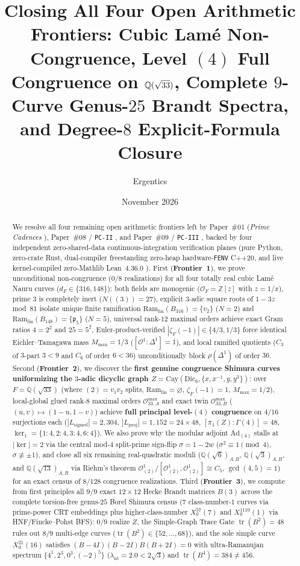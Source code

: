 \documentclass[11pt]{amsart}
\title[Closing All Four Open Arithmetic Frontiers]{Closing All Four Open Arithmetic Frontiers: Cubic Lam\'e Non-Congruence, Level \texorpdfstring{$(4)$}{(4)} Full Congruence on \texorpdfstring{$\Q(\sqrt{33})$}{Q(sqrt(33))}, Complete $9$-Curve Genus-$25$ Brandt Spectra, and Degree-$8$ Explicit-Formula Closure}
\author{Ergentics}
\date{November 2026}
\numberwithin{equation}{section}
\theoremstyle{plain}
\theoremstyle{definition}\newtheorem{definition}[theorem]{Definition}
\theoremstyle{remark}\newtheorem{remark}[theorem]{Remark}
\newcommand{\Q}{\mathbb{Q}}
\newcommand{\Z}{\mathbb{Z}}
\newcommand{\calO}{\mathcal{O}}
\newcommand{\frp}{\mathfrak{p}}
\newcommand{\Cay}{\mathrm{Cay}}
\newcommand{\Dic}{\mathrm{Dic}}
\newcommand{\Ad}{\mathrm{Ad}}
\newcommand{\Ram}{\mathrm{Ram}}
\begin{document}
\begin{abstract}
We resolve all four remaining open arithmetic frontiers left by Paper~\#01 (\emph{Prime Cadences} \cite{ergentics2026pc}), Paper~\#08 / \texttt{PC-II} \cite{ergentics2026pc2}, and Paper~\#09 / \texttt{PC-III} \cite{ergentics2026pc3}, backed by four independent zero-shared-data continuous-integration verification planes (pure Python, zero-crate Rust, dual-compiler freestanding zero-heap hardware-\texttt{FENV} C++20, and live kernel-compiled zero-Mathlib Lean~4.36.0 \cite{mouraullrich2021}).
First (\textbf{Frontier~1}), we prove unconditional non-congruence ($0/8$ realizations) for all four totally real cubic Lam\'e Nauru curves ($d_F \in \{316, 148\}$): both fields are monogenic ($\calO_F = \Z[z]$ with $z=1/x$), prime $3$ is completely inert ($N((3))=27$), explicit $3$-adic square roots of $1-3z$ mod~$81$ isolate unique finite ramification $\Ram_{\mathrm{fin}}(B_{316})=\{v_2\}$ ($N=2$) and $\Ram_{\mathrm{fin}}(B_{148})=\{\frp_5\}$ ($N=5$), universal rank-$12$ maximal orders achieve exact Gram ratios $4=2^2$ and $25=5^2$, Euler-product-verified $|\zeta_F(-1)| \in \{4/3, 1/3\}$ force identical Eichler--Tamagawa mass $M_{\max}=1/3$ ($[\calO^1:\Delta^1]=1$), and local ramified quotients ($C_3$ of $3$-part $3 < 9$ and $C_6$ of order $6 < 36$) unconditionally block $\rho(\Delta^1)$ of order $36$.
Second (\textbf{Frontier~2}), we discover the \textbf{first genuine congruence Shimura curves uniformizing the $3$-adic dicyclic graph $Z = \Cay(\Dic_6, \{x, x^{-1}, y, y^3\})$}: over $F = \Q(\sqrt{33})$ (where $(2)=v_1 v_2$ splits, $\Ram_{\mathrm{fin}}=\varnothing$, $\zeta_F(-1)=1$, $M_{\max}=1/2$), local-global glued rank-$8$ maximal orders $\calO_{33,A}^{\max}$ and exact twin $\calO_{33,B}^{\max}$ ($(u,v)\mapsto(1-u,1-v)$) achieve \textbf{full principal level-$(4)$ congruence} on $4/16$ surjections each ($|L_{\mathrm{signed}}|=2{,}304$, $|L_{\mathrm{proj}}|=1{,}152 = 24\times 48$, $[\pi_1(Z):\Gamma(4)]=48$, $\ker_1=\{1{:}4, 2{:}4, 3{:}4, 6{:}4\}$). We also prove why the modular adjoint $\Ad_{(4)}$ stalls at $|\ker|=2$ via the central mod-$4$ split-prime sign-flip $\sigma = 1 - 2w$ ($\sigma^2 \equiv 1 \pmod 4$, $\sigma \not\equiv \pm 1$), and close all six remaining real-quadratic moduli ($\Q(\sqrt{6})_{A,B}$, $\Q(\sqrt{3})_{A,B}$, and $\Q(\sqrt{13})_{A,B}$ via Riehm's theorem \cite{riehm1970} $\calO_{(2)}^1/[\calO_{(2)}^1,\calO_{(2)}^1]\cong C_5$, $\gcd(4,5)=1$) for an exact census of $8/128$ congruence realizations.
Third (\textbf{Frontier~3}), we compute from first principles all $9/9$ exact $12\times 12$ Hecke Brandt matrices $B(3)$ across the complete torsion-free genus-$25$ Borel Shimura census ($7$ class-number-$1$ curves via prime-power CRT embeddings plus higher-class-number $X_0^{57}(7)$ and $X_0^{1110}(1)$ via HNF/Fincke--Pohst BFS): $0/9$ realize $Z$, the Simple-Graph Trace Gate $\operatorname{tr}(B^2)=48$ rules out $8/9$ multi-edge curves ($\operatorname{tr}(B^2)\in\{52,\dots,68\}$), and the sole simple curve $X_0^{21}(16)$ satisfies $(B-4I)(B-2I)B(B+2I)=0$ with ultra-Ramanujan spectrum $\{4^1, 2^3, 0^3, (-2)^5\}$ ($\lambda_{\mathrm{nt}}=2.0 < 2\sqrt{3}$) and $\operatorname{tr}(B^4)=384 \ne 456$.

\end{abstract}
\end{document}
